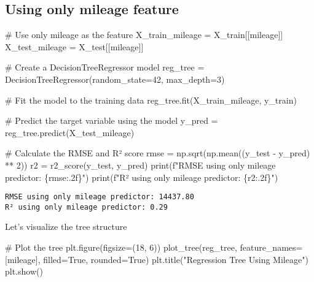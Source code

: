 \documentclass[
  letterpaper,
  DIV=11,
  numbers=noendperiod]{scrreprt}
\newenvironment{Shaded}{\begin{snugshade}}{\end{snugshade}}
\newcommand{\BuiltInTok}[1]{\textcolor[rgb]{0.00,0.23,0.31}{#1}}
\newcommand{\CommentTok}[1]{\textcolor[rgb]{0.37,0.37,0.37}{#1}}
\newcommand{\DecValTok}[1]{\textcolor[rgb]{0.68,0.00,0.00}{#1}}
\newcommand{\NormalTok}[1]{\textcolor[rgb]{0.00,0.23,0.31}{#1}}
\newcommand{\OperatorTok}[1]{\textcolor[rgb]{0.37,0.37,0.37}{#1}}
\newcommand{\SpecialCharTok}[1]{\textcolor[rgb]{0.37,0.37,0.37}{#1}}
\newcommand{\SpecialStringTok}[1]{\textcolor[rgb]{0.13,0.47,0.30}{#1}}
\newcommand{\StringTok}[1]{\textcolor[rgb]{0.13,0.47,0.30}{#1}}
\newcommand{\VariableTok}[1]{\textcolor[rgb]{0.07,0.07,0.07}{#1}}
\begin{document}
\subsection{Using only mileage
feature}\label{using-only-mileage-feature}

\begin{Shaded}
\begin{Highlighting}[]
\CommentTok{\# Use only \textquotesingle{}mileage\textquotesingle{} as the feature}
\NormalTok{X\_train\_mileage }\OperatorTok{=}\NormalTok{ X\_train[[}\StringTok{\textquotesingle{}mileage\textquotesingle{}}\NormalTok{]]}
\NormalTok{X\_test\_mileage }\OperatorTok{=}\NormalTok{ X\_test[[}\StringTok{\textquotesingle{}mileage\textquotesingle{}}\NormalTok{]]}

\CommentTok{\# Create a DecisionTreeRegressor model}
\NormalTok{reg\_tree }\OperatorTok{=}\NormalTok{ DecisionTreeRegressor(random\_state}\OperatorTok{=}\DecValTok{42}\NormalTok{, max\_depth}\OperatorTok{=}\DecValTok{3}\NormalTok{)}

\CommentTok{\# Fit the model to the training data}
\NormalTok{reg\_tree.fit(X\_train\_mileage, y\_train)}

\CommentTok{\# Predict the target variable using the model}
\NormalTok{y\_pred }\OperatorTok{=}\NormalTok{ reg\_tree.predict(X\_test\_mileage)}

\CommentTok{\# Calculate the RMSE and R² score}
\NormalTok{rmse }\OperatorTok{=}\NormalTok{ np.sqrt(np.mean((y\_test }\OperatorTok{{-}}\NormalTok{ y\_pred) }\OperatorTok{**} \DecValTok{2}\NormalTok{))}
\NormalTok{r2 }\OperatorTok{=}\NormalTok{ r2\_score(y\_test, y\_pred)}
\BuiltInTok{print}\NormalTok{(}\SpecialStringTok{f"RMSE using only mileage predictor: }\SpecialCharTok{\{}\NormalTok{rmse}\SpecialCharTok{:.2f\}}\SpecialStringTok{"}\NormalTok{)}
\BuiltInTok{print}\NormalTok{(}\SpecialStringTok{f"R² using only mileage predictor: }\SpecialCharTok{\{}\NormalTok{r2}\SpecialCharTok{:.2f\}}\SpecialStringTok{"}\NormalTok{)}
\end{Highlighting}
\end{Shaded}

\begin{verbatim}
RMSE using only mileage predictor: 14437.80
R² using only mileage predictor: 0.29
\end{verbatim}

Let's visualize the tree structure

\begin{Shaded}
\begin{Highlighting}[]
\CommentTok{\# Plot the tree}
\NormalTok{plt.figure(figsize}\OperatorTok{=}\NormalTok{(}\DecValTok{18}\NormalTok{, }\DecValTok{6}\NormalTok{))}
\NormalTok{plot\_tree(reg\_tree, feature\_names}\OperatorTok{=}\NormalTok{[}\StringTok{\textquotesingle{}mileage\textquotesingle{}}\NormalTok{], filled}\OperatorTok{=}\VariableTok{True}\NormalTok{, rounded}\OperatorTok{=}\VariableTok{True}\NormalTok{)}
\NormalTok{plt.title(}\StringTok{"Regression Tree Using Mileage"}\NormalTok{)}
\NormalTok{plt.show()}
\end{Highlighting}
\end{Shaded}
\end{document}
